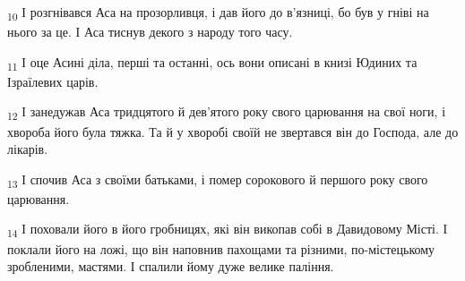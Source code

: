 \begin{tcolorbox}
\textsubscript{10} І розгнівався Аса на прозорливця, і дав його до в'язниці, бо був у гніві на нього за це. І Аса тиснув декого з народу того часу.
\end{tcolorbox}
\begin{tcolorbox}
\textsubscript{11} І оце Асині діла, перші та останні, ось вони описані в книзі Юдиних та Ізраїлевих царів.
\end{tcolorbox}
\begin{tcolorbox}
\textsubscript{12} І занедужав Аса тридцятого й дев'ятого року свого царювання на свої ноги, і хвороба його була тяжка. Та й у хворобі своїй не звертався він до Господа, але до лікарів.
\end{tcolorbox}
\begin{tcolorbox}
\textsubscript{13} І спочив Аса з своїми батьками, і помер сорокового й першого року свого царювання.
\end{tcolorbox}
\begin{tcolorbox}
\textsubscript{14} І поховали його в його гробницях, які він викопав собі в Давидовому Місті. І поклали його на ложі, що він наповнив пахощами та різними, по-містецькому зробленими, мастями. І спалили йому дуже велике паління.
\end{tcolorbox}
